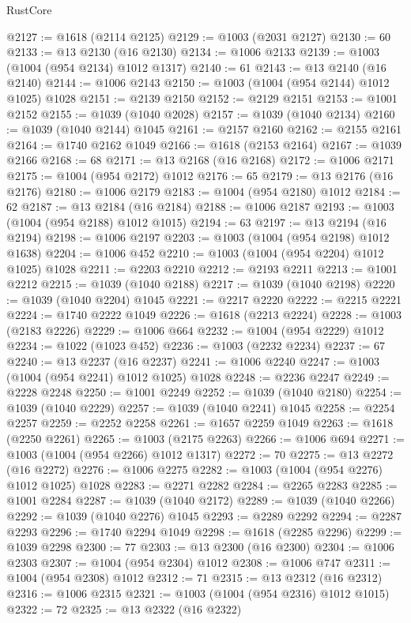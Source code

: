 \begin{lexlean}{RustCore}
\begin{coremodule}
@2127 := @1618 (@2114 @2125)
@2129 := @1003 (@2031 @2127)
@2130 := 60
@2133 := @13 @2130 (@16 @2130)
@2134 := @1006 @2133
@2139 := @1003 (@1004 (@954 @2134) @1012 @1317)
@2140 := 61
@2143 := @13 @2140 (@16 @2140)
@2144 := @1006 @2143
@2150 := @1003 (@1004 (@954 @2144) @1012 @1025) @1028
@2151 := @2139 @2150
@2152 := @2129 @2151
@2153 := @1001 @2152
@2155 := @1039 (@1040 @2028)
@2157 := @1039 (@1040 @2134)
@2160 := @1039 (@1040 @2144) @1045
@2161 := @2157 @2160
@2162 := @2155 @2161
@2164 := @1740 @2162 @1049
@2166 := @1618 (@2153 @2164)
@2167 := @1039 @2166
@2168 := 68
@2171 := @13 @2168 (@16 @2168)
@2172 := @1006 @2171
@2175 := @1004 (@954 @2172) @1012
@2176 := 65
@2179 := @13 @2176 (@16 @2176)
@2180 := @1006 @2179
@2183 := @1004 (@954 @2180) @1012
@2184 := 62
@2187 := @13 @2184 (@16 @2184)
@2188 := @1006 @2187
@2193 := @1003 (@1004 (@954 @2188) @1012 @1015)
@2194 := 63
@2197 := @13 @2194 (@16 @2194)
@2198 := @1006 @2197
@2203 := @1003 (@1004 (@954 @2198) @1012 @1638)
@2204 := @1006 @452
@2210 := @1003 (@1004 (@954 @2204) @1012 @1025) @1028
@2211 := @2203 @2210
@2212 := @2193 @2211
@2213 := @1001 @2212
@2215 := @1039 (@1040 @2188)
@2217 := @1039 (@1040 @2198)
@2220 := @1039 (@1040 @2204) @1045
@2221 := @2217 @2220
@2222 := @2215 @2221
@2224 := @1740 @2222 @1049
@2226 := @1618 (@2213 @2224)
@2228 := @1003 (@2183 @2226)
@2229 := @1006 @664
@2232 := @1004 (@954 @2229) @1012
@2234 := @1022 (@1023 @452)
@2236 := @1003 (@2232 @2234)
@2237 := 67
@2240 := @13 @2237 (@16 @2237)
@2241 := @1006 @2240
@2247 := @1003 (@1004 (@954 @2241) @1012 @1025) @1028
@2248 := @2236 @2247
@2249 := @2228 @2248
@2250 := @1001 @2249
@2252 := @1039 (@1040 @2180)
@2254 := @1039 (@1040 @2229)
@2257 := @1039 (@1040 @2241) @1045
@2258 := @2254 @2257
@2259 := @2252 @2258
@2261 := @1657 @2259 @1049
@2263 := @1618 (@2250 @2261)
@2265 := @1003 (@2175 @2263)
@2266 := @1006 @694
@2271 := @1003 (@1004 (@954 @2266) @1012 @1317)
@2272 := 70
@2275 := @13 @2272 (@16 @2272)
@2276 := @1006 @2275
@2282 := @1003 (@1004 (@954 @2276) @1012 @1025) @1028
@2283 := @2271 @2282
@2284 := @2265 @2283
@2285 := @1001 @2284
@2287 := @1039 (@1040 @2172)
@2289 := @1039 (@1040 @2266)
@2292 := @1039 (@1040 @2276) @1045
@2293 := @2289 @2292
@2294 := @2287 @2293
@2296 := @1740 @2294 @1049
@2298 := @1618 (@2285 @2296)
@2299 := @1039 @2298
@2300 := 77
@2303 := @13 @2300 (@16 @2300)
@2304 := @1006 @2303
@2307 := @1004 (@954 @2304) @1012
@2308 := @1006 @747
@2311 := @1004 (@954 @2308) @1012
@2312 := 71
@2315 := @13 @2312 (@16 @2312)
@2316 := @1006 @2315
@2321 := @1003 (@1004 (@954 @2316) @1012 @1015)
@2322 := 72
@2325 := @13 @2322 (@16 @2322)

\end{coremodule}
\end{lexlean}
